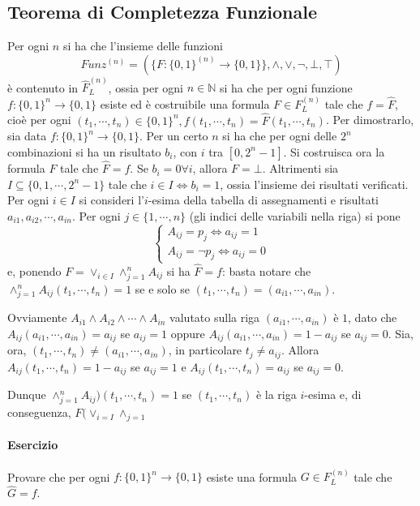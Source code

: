 \subsection{Teorema di Completezza Funzionale}
Per ogni $n$ si ha che l'insieme delle funzioni 
$$
Funz^{(n)} = (\{F: \{0,1\}^{(n)} \rightarrow \{0,1\}\}, \land, \lor, \neg, \bot, \top)
$$
è contenuto in $\hat{F}^{(n)}_L$, 
ossia per ogni $n \in \mathbb{N}$ si ha che per ogni funzione 
$f: \{0,1\}^n \rightarrow \{0,1\}$ esiste ed è costruibile una 
formula $F \in F^{(n)}_L$ tale che $f = \hat{F}$, cioè per ogni 
$(t_1, \cdots, t_n) \in \{0,1\}^n, f(t_1, \cdots, t_n) = \hat{F}(t_1, \cdots, t_n)$. 
Per dimostrarlo, sia data $f: \{0,1\}^n \rightarrow \{0,1\}$. Per un certo 
$n$ si ha che per ogni delle $2^n$ combinazioni si ha un risultato $b_i$, 
con $i$ tra $[0, 2^n -1]$. Si costruisca ora la formula $F$ tale che 
$\hat{F} = f$. Se $b_i = 0 \forall i$, allora $F = \bot$. Altrimenti 
sia $I \subseteq \{0,1,\cdots,2^n-1\}$ tale che $i \in I \iff b_i = 1$, 
ossia l'insieme dei risultati verificati. Per ogni $i \in I$ si consideri l'$i$-esima
della tabella di assegnamenti e risultati 
$a_{i1}, a_{i2}, \cdots, a_{in}$. Per ogni $j \in \{1, \cdots, n\}$ (gli indici delle 
variabili nella riga) si pone 
$$
\begin{cases}
  A_{ij} = p_j \iff a_{ij} = 1 \\
    A_{ij} = \neg p_j \iff a_{ij} = 0
\end{cases}
$$
e, ponendo $F = \lor_{i \in I} \land_{j = 1}^n A_{ij}$
si ha $\hat{F} = f$: basta notare che $\land_{j = 1}^n A_{ij}(t_1, \cdots, t_n) = 1$ 
se e solo se $(t_1, \cdots, t_n) = (a_{i1}, \cdots, a_{in})$. 

Ovviamente $A_{i1} \land A_{i2} \land \cdots \land A_{in}$ valutato sulla riga 
$(a_{i1}, \cdots, a_{in})$ è $1$, dato che $A_{ij}(a_{i1}, \cdots, a_{in}) = a_{ij} $ 
se $a_{ij} = 1$ oppure $A_{ij}(a_{i1}, \cdots, a_{in}) = 1 - a_{ij}$ se 
$a_{ij} = 0$. Sia, ora, $(t_1, \cdots, t_n) \neq (a_{i1}, \cdots, a_{in})$, 
in particolare $t_j \neq a_{ij}$. Allora $A_{ij}(t_1, \cdots, t_n) = 1 - a_{ij}$ 
se $a_{ij} = 1$ e $A_{ij}(t_1, \cdots, t_n) = a_{ij}$ se $a_{ij} = 0$.

Dunque $\land_{j = 1}^{n} A_{ij}) (t_1, \cdots, t_n) = 1$ se $(t_1, \cdots, t_n)$ è 
la riga $i$-esima e, di conseguenza, $F(\lor_{i=I}\land_{j = 1}$ %

\paragraph{Esercizio}
Provare che per ogni $f: \{0,1\}^n \rightarrow \{0,1\}$ esiste una formula 
$G \in F^{(n)}_L$ tale che $\hat{G} = f$. 


